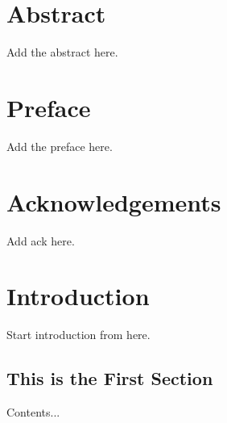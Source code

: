 
\doublespacing

\chapter*{Abstract} 
Add the abstract here.

\setcounter{page}{2}
\renewcommand{\thepage}{\roman{page}} %

\onehalfspacing
\chapter*{Preface} 
Add the preface here.

\chapter*{Acknowledgements} 
Add ack here.

\tableofcontents
\listoftables
\listoffigures
\listofalgorithms {}

\chapter{Introduction} \label{sec: introduction}

\setcounter{page}{1}
\renewcommand{\thepage}{\arabic{page}} %

Start introduction from here.

\section{This is the First Section}
Contents...

